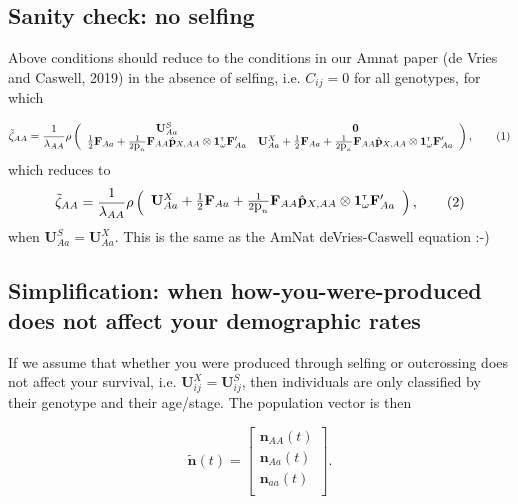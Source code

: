 \documentclass[11pt]{article}
\newcommand\numberthis{\addtocounter{equation}{1}\tag{\theequation}}
\def\mbf#1{\mathbf{#1}}
\newcommand{\tr}{{\mbox{\tiny \sf T}}}
\begin{document}
\begin{landscape}
\subsection*{Sanity check: no selfing}
Above conditions should reduce to the conditions in our Amnat paper (de Vries and Caswell, 2019) in the absence of selfing, i.e. $C_{ij}=0$ for all genotypes, for which

\begin{align*} \label{eq:eigAA}
	\tilde{\zeta}_{AA} = 
		\frac{1}{\lambda_{AA}}\rho\left(\begin{array}{cc}
\mathbf{U}^S_{Aa}  & \mathbf{0} \\
 \frac{1}{2} \mbf{F}_{Aa}+\frac{1}{2\mbox{p}_{n}}\mbf{F}_{AA} \hat{\mbf{p}}_{X,AA} \otimes \mathbf{1}^\tr_{\omega} \mathbf{F}_{Aa}^\prime &\mathbf{U}^X_{Aa} + \frac{1}{2} \mbf{F}_{Aa} +\frac{1}{2\mbox{p}_{n}} \mbf{F}_{AA} \hat{\mbf{p}}_{X,AA} \otimes \mathbf{1}^\tr_{\omega} \mathbf{F}_{Aa}^\prime
			\end{array} \right), \numberthis
\end{align*}
which reduces to 
\begin{align*} \label{eq:eigAA}
	\tilde{\zeta}_{AA} = 
		\frac{1}{\lambda_{AA}}\rho\left(\begin{array}{c}
\mathbf{U}^X_{Aa} + \frac{1}{2} \mbf{F}_{Aa} +\frac{1}{2\mbox{p}_{n}} \mbf{F}_{AA} \hat{\mbf{p}}_{X,AA} \otimes \mathbf{1}^\tr_{\omega} \mathbf{F}_{Aa}^\prime
			\end{array} \right), \numberthis
\end{align*}
when $\mathbf{U}^S_{Aa}=\mathbf{U}^X_{Aa}$. This is the same as the AmNat deVries-Caswell equation :-) 

\newpage
\end{landscape}


\subsection*{Simplification: when how-you-were-produced does not affect your demographic rates}
If we assume that whether you were produced through selfing or outcrossing does not affect your survival, i.e. $\mathbf{U}^X_{ij}=\mathbf{U}^S_{ij}$, then individuals are only classified by their genotype and their age/stage. The population vector is then 

\begin{equation}
	\tilde{\mbf{n}}(t) =  \left[
								\begin{array}{c}
									\mbf{n}_{AA}(t) \\
									\mbf{n}_{Aa}(t) \\
									\mbf{n}_{aa}(t) \\ 
						\end{array} \right].
\end{equation}
\end{document}
